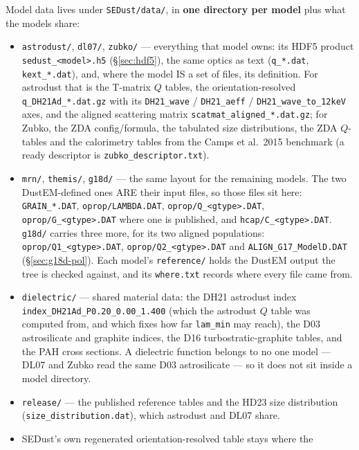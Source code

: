 \documentclass{my_memo}
\newcommand{\code}[1]{\texttt{#1}}
\begin{document}
Model data lives under \code{SEDust/data/}, in \textbf{one directory per
model} plus what the models share:
\begin{itemize}
\item \code{astrodust/}, \code{dl07/}, \code{zubko/} --- everything that
      model owns: its HDF5 product \code{sedust\_<model>.h5}
      (\S\ref{sec:hdf5}), the same optics as text (\code{q\_*.dat},
      \code{kext\_*.dat}), and, where the model IS a set of files, its
      definition. For astrodust that is the T-matrix $Q$ tables, the
      orientation-resolved \code{q\_DH21Ad\_*.dat.gz} with its
      \code{DH21\_wave} / \code{DH21\_aeff} / \code{DH21\_wave\_to\_12keV}
      axes, and the aligned scattering matrix
      \code{scatmat\_aligned\_*.dat.gz}; for Zubko, the ZDA config/formula,
      the tabulated size distributions, the ZDA $Q$-tables and the calorimetry
      tables from the Camps et al.\ 2015 benchmark (a ready descriptor is
      \code{zubko\_descriptor.txt}).
\item \code{mrn/}, \code{themis/}, \code{g18d/} --- the same layout for the
      remaining models. The two DustEM-defined ones ARE their input files, so
      those files sit here: \code{GRAIN\_*.DAT}, \code{oprop/LAMBDA.DAT},
      \code{oprop/Q\_<gtype>.DAT}, \code{oprop/G\_<gtype>.DAT} where one is
      published, and \code{hcap/C\_<gtype>.DAT}. \code{g18d/} carries three
      more, for its two aligned populations: \code{oprop/Q1\_<gtype>.DAT},
      \code{oprop/Q2\_<gtype>.DAT} and \code{ALIGN\_G17\_ModelD.DAT}
      (\S\ref{sec:g18d-pol}). Each model's \code{reference/} holds the DustEM
      output the tree is checked against, and its \code{where.txt} records
      where every file came from.
\item \code{dielectric/} --- shared material data: the DH21 astrodust index
      \code{index\_DH21Ad\_P0.20\_0.00\_1.400} (which the astrodust $Q$ table
      was computed from, and which fixes how far \code{lam\_min} may reach),
      the D03 astrosilicate and graphite indices, the D16
      turbostratic-graphite tables, and the PAH cross sections. A dielectric
      function belongs to no one model --- DL07 and Zubko read the same D03
      astrosilicate --- so it does not sit inside a model directory.
\item \code{release/} --- the published reference tables and the HD23 size
      distribution (\code{size\_distribution.dat}), which astrodust and DL07
      share.
\item SEDust's own regenerated orientation-resolved table stays where the

\end{itemize}
\end{document}
